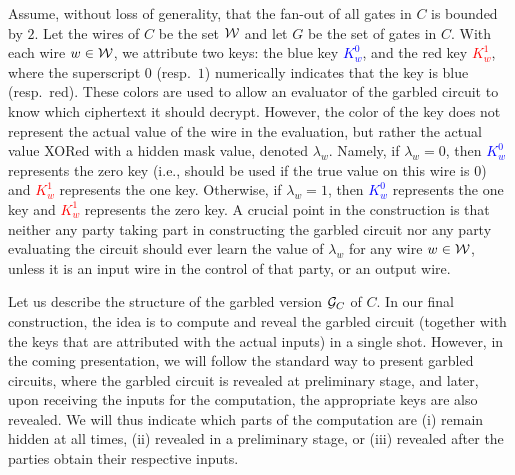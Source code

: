 Assume, without loss of generality, that the fan-out of all gates in $C$ is bounded by $2$.
Let the wires of $C$ be the set ${\cal W}$ 
and let $G$ be the set of gates in $C$. With each wire $w\in{\cal W}$, we attribute two keys: the blue key \textcolor{blue}{$K^{0}_w$}, and the red key \textcolor{red}{$K^{1}_w$}, where the superscript $0$ (resp.~$1$) numerically indicates that the key is blue (resp.~red). These colors are used to allow an evaluator of the garbled circuit to know which ciphertext it should decrypt. However, the color of the key does not represent the actual value of the wire in the evaluation, but rather the actual value XORed with a hidden mask value, denoted $\lambda_w$. Namely, if $\lambda_w = 0$, then \textcolor{blue}{$K^{0}_w$} represents the zero key (i.e., should be used if the true value on this wire is $0$) and \textcolor{red}{$K^{1}_w$}
represents the one key. Otherwise, if $\lambda_w = 1$, then \textcolor{blue}{$K^{0}_w$} represents the one key and \textcolor{red}{$K^{1}_w$}
represents the zero key. A crucial point in the construction is that neither any party taking part in constructing the garbled circuit nor any party evaluating the circuit should ever learn the value of $\lambda_w$ for any wire $w\in {\cal W}$, unless it is an input wire in the control of that party, or an output wire.

Let us describe the structure of the garbled version ${\mathcal{G}}_{C}$ of $C$. In our final construction, the idea is to compute and reveal the garbled circuit (together with the keys that are attributed with the actual inputs) in a single shot. However, in the coming presentation, we will follow the standard way to present garbled circuits, where  the garbled circuit is revealed at preliminary stage, and later, upon receiving the inputs for the computation, the appropriate keys are also revealed. We will thus indicate which parts of the computation are (i) remain hidden at all times, (ii) revealed in a preliminary stage, or (iii) revealed after the parties obtain their respective inputs.
 
